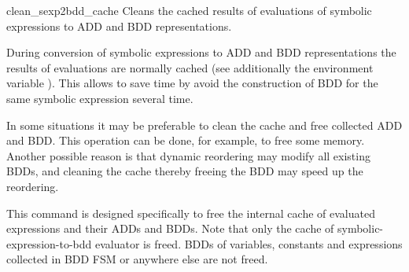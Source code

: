 \begin{nusmvCommand} {clean\_sexp2bdd\_cache} 
{Cleans the cached results of evaluations of symbolic expressions
to ADD and BDD representations.}


During conversion of symbolic expressions to ADD and BDD
representations the results of evaluations are normally cached (see
additionally the environment variable
). This allows to save time by avoid the
construction of BDD for the same symbolic expression several time.

In some situations it may be preferable to clean the cache and
free collected ADD and BDD. This operation can be done, for example,
to free some memory. Another possible reason is that dynamic
reordering may modify all existing BDDs, and cleaning the cache
thereby freeing the BDD may speed up the reordering.

This command is designed specifically to free the internal cache of
evaluated expressions and their ADDs and BDDs.
%
Note that only the cache of symbolic-expression-to-bdd evaluator is
freed.  BDDs of variables, constants and expressions collected in BDD
FSM or anywhere else are not freed.

\end{nusmvCommand}
